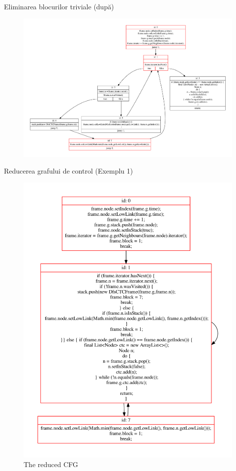 \documentclass{beamer}
\begin{document}
\begin{frame}{Eliminarea blocurilor triviale (după)}
    \begin{figure}[htb]
        \centering
        \includegraphics[width=\linewidth]{../../../theses/diploma/src/graph/trivial-after.pdf}
    \end{figure}
\end{frame}

\begin{frame}{Reducerea grafului de control (Exemplu 1)}
    \begin{figure}[htb]
        \centering
        \includegraphics[width=.5\textwidth]{../../../theses/diploma/src/graph/inline-after-1.pdf}
        \caption{The reduced CFG\label{img:inline1}}
    \end{figure}
\end{frame}
\end{document}
